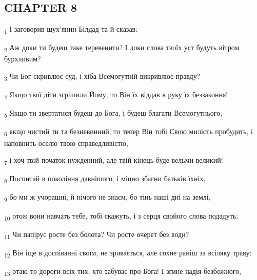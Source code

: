 \subsection{CHAPTER 8}
\begin{tcolorbox}
\textsubscript{1} І заговорив шух'янин Білдад та й сказав:
\end{tcolorbox}
\begin{tcolorbox}
\textsubscript{2} Аж доки ти будеш таке теревенити? І доки слова твоїх уст будуть вітром бурхливим?
\end{tcolorbox}
\begin{tcolorbox}
\textsubscript{3} Чи Бог скривлює суд, і хіба Всемогутній викривлює правду?
\end{tcolorbox}
\begin{tcolorbox}
\textsubscript{4} Якщо твої діти згрішили Йому, то Він їх віддав в руку їх беззаконня!
\end{tcolorbox}
\begin{tcolorbox}
\textsubscript{5} Якщо ти звертатися будеш до Бога, і будеш благати Всемогутнього,
\end{tcolorbox}
\begin{tcolorbox}
\textsubscript{6} якщо чистий ти та безневинний, то тепер Він тобі Свою милість пробудить, і наповнить оселю твою справедливістю,
\end{tcolorbox}
\begin{tcolorbox}
\textsubscript{7} і хоч твій початок нужденний, але твій кінець буде вельми великий!
\end{tcolorbox}
\begin{tcolorbox}
\textsubscript{8} Поспитай в покоління давнішого, і міцно збагни батьків їхніх,
\end{tcolorbox}
\begin{tcolorbox}
\textsubscript{9} бо ми ж учорашні, й нічого не знаєм, бо тінь наші дні на землі,
\end{tcolorbox}
\begin{tcolorbox}
\textsubscript{10} отож вони навчать тебе, тобі скажуть, і з серця свойого слова подадуть:
\end{tcolorbox}
\begin{tcolorbox}
\textsubscript{11} Чи папірус росте без болота? Чи росте очерет без води?
\end{tcolorbox}
\begin{tcolorbox}
\textsubscript{12} Він іще в доспіванні своїм, не зривається, але сохне раніш за всіляку траву:
\end{tcolorbox}
\begin{tcolorbox}
\textsubscript{13} отакі то дороги всіх тих, хто забуває про Бога! І згине надія безбожного,
\end{tcolorbox}
